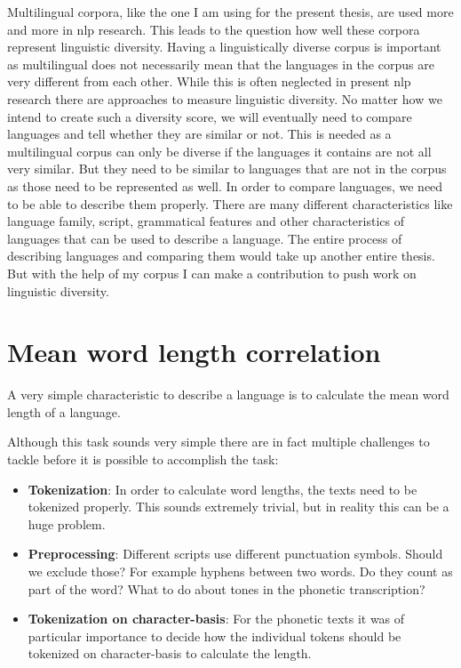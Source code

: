 
\label{chap:mwl}
Multilingual corpora, like the one I am using for the present thesis, are used more and more in \ac{nlp} research. This leads to the question how well these corpora represent linguistic diversity. Having a linguistically diverse corpus is important as multilingual does not necessarily mean that the languages in the corpus are very different from each other. While this is often neglected in present \ac{nlp} research there are approaches to measure linguistic diversity. No matter how we intend to create such a diversity score, we will eventually need to compare languages and tell whether they are similar or not. This is needed as a multilingual corpus can only be diverse if the languages it contains are not all very similar. But they need to be similar to languages that are not in the corpus as those need to be represented as well. In order to compare languages, we need to be able to describe them properly. There are many different characteristics like language family, script, grammatical features and other characteristics of languages that can be used to describe a language. The entire process of describing languages and comparing them would take up another entire thesis. But with the help of my corpus I can make a contribution to push work on linguistic diversity.

\section{Mean word length correlation}
A very simple characteristic to describe a language is to calculate the mean word length of a language.


Although this task sounds very simple there are in fact multiple challenges to tackle before it is possible to accomplish the task:

\begin{itemize}
    \item \textbf{Tokenization}: In order to calculate word lengths, the texts need to be tokenized properly. This sounds extremely trivial, but in reality this can be a huge problem.
    \item \textbf{Preprocessing}: Different scripts use different punctuation symbols. Should we exclude those? For example hyphens between two words. Do they count as part of the word? What to do about tones in the phonetic transcription?
    \item \textbf{Tokenization on character-basis}: For the phonetic texts it was of particular importance to decide how the individual tokens should be tokenized on character-basis to calculate the length. 
\end{itemize}

